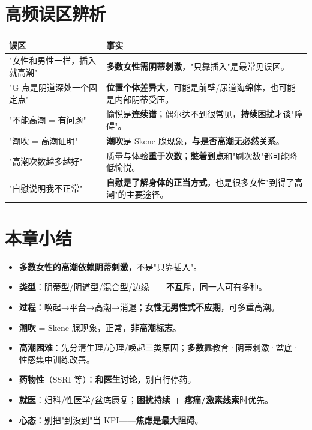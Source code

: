 \documentclass[12pt,UTF8,openany]{ctexbook}
\begin{document}
\section{高频误区辨析}

\begin{tabularx}{\textwidth}{l X}
\toprule
\textbf{误区} & \textbf{事实} \\
\midrule
"女性和男性一样，插入就高潮" & \textbf{多数女性需阴蒂刺激}，"只靠插入"是最常见误区。 \\
"G 点是阴道深处一个固定点" & \textbf{位置个体差异大}，可能是前壁/尿道海绵体，也可能是内部阴蒂受压。 \\
"不能高潮 = 有问题" & 愉悦是\textbf{连续谱}；偶尔达不到很常见，\textbf{持续困扰}才谈"障碍"。 \\
"潮吹 = 高潮证明" & \textbf{潮吹}是 Skene 腺现象，\textbf{与是否高潮无必然关系}。 \\
"高潮次数越多越好" & 质量与体验\textbf{重于次数}；\textbf{憋着到点}和"刷次数"都可能降低愉悦。 \\
"自慰说明我不正常" & \textbf{自慰是了解身体的正当方式}，也是很多女性"到得了高潮"的主要途径。 \\
\bottomrule
\end{tabularx}

\section{本章小结}
\begin{itemize}[leftmargin=2em,itemsep=0.2em]
  \item \textbf{多数女性的高潮依赖阴蒂刺激}，不是"只靠插入"。
  \item \textbf{类型}：阴蒂型/阴道型/混合型/边缘——\textbf{不互斥}，同一人可有多种。
  \item \textbf{过程}：唤起→平台→高潮→消退；\textbf{女性无男性式不应期}，可多重高潮。
  \item \textbf{潮吹} = Skene 腺现象，正常，\textbf{非高潮标志}。
  \item \textbf{高潮困难}：先分清生理/心理/唤起三类原因；\textbf{多数}靠教育·阴蒂刺激·盆底·性感集中训练改善。
  \item \textbf{药物性}（SSRI 等）：\textbf{和医生讨论}，别自行停药。
  \item \textbf{就医}：妇科/性医学/盆底康复；\textbf{困扰持续 + 疼痛/激素线索}时优先。
  \item \textbf{心态}：别把"到没到"当 KPI——\textbf{焦虑是最大阻碍}。
\end{itemize}
\end{document}

